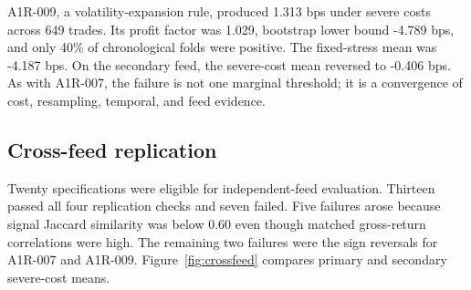 A1R-009, a volatility-expansion rule, produced 1.313 bps under severe costs across 649 trades. Its profit factor was 1.029, bootstrap lower bound -4.789 bps, and only 40\% of chronological folds were positive. The fixed-stress mean was -4.187 bps. On the secondary feed, the severe-cost mean reversed to -0.406 bps. As with A1R-007, the failure is not one marginal threshold; it is a convergence of cost, resampling, temporal, and feed evidence.

\begin{table}[t]
\centering
\caption{The five specifications with positive severe-cost means. Returns are mean basis points per native trade or rebalance.}\label{tab:positive_five}
\end{table}

\subsection{Cross-feed replication}\label{subsec:crossfeed_results}

Twenty specifications were eligible for independent-feed evaluation. Thirteen passed all four replication checks and seven failed. Five failures arose because signal Jaccard similarity was below 0.60 even though matched gross-return correlations were high. The remaining two failures were the sign reversals for A1R-007 and A1R-009. Figure~\ref{fig:crossfeed} compares primary and secondary severe-cost means.

